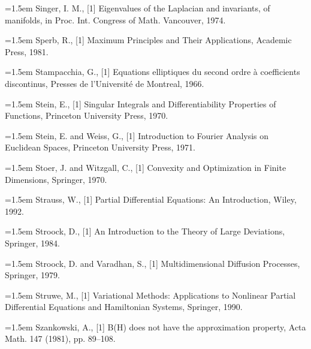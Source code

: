\noindent\hangindent=1.5em Singer, I. M., \hypertarget{ref:Singer-1}{[1]} Eigenvalues of the Laplacian and invariants, of manifolds, in Proc. Int. Congress of Math. Vancouver, 1974.\par{}
\noindent\hangindent=1.5em Sperb, R., \hypertarget{ref:Sperb-1}{[1]} Maximum Principles and Their Applications, Academic Press, 1981.\par{}
\noindent\hangindent=1.5em Stampacchia, G., \hypertarget{ref:Stampacchia-1}{[1]} Equations elliptiques du second ordre à coefficients discontinus, Presses de l'Université de Montreal, 1966.\par{}
\noindent\hangindent=1.5em Stein, E., \hypertarget{ref:Stein-1}{[1]} Singular Integrals and Differentiability Properties of Functions, Princeton University Press, 1970.\par{}
\noindent\hangindent=1.5em Stein, E. and Weiss, G., \hypertarget{ref:SteinWeiss-1}{[1]} Introduction to Fourier Analysis on Euclidean Spaces, Princeton University Press, 1971.\par{}
\noindent\hangindent=1.5em Stoer, J. and Witzgall, C., \hypertarget{ref:StoerWitzgall-1}{[1]} Convexity and Optimization in Finite Dimensions, Springer, 1970.\par{}
\noindent\hangindent=1.5em Strauss, W., \hypertarget{ref:Strauss-1}{[1]} Partial Differential Equations: An Introduction, Wiley, 1992.\par{}
\noindent\hangindent=1.5em Stroock, D., \hypertarget{ref:Stroock-1}{[1]} An Introduction to the Theory of Large Deviations, Springer, 1984.\par{}
\noindent\hangindent=1.5em Stroock, D. and Varadhan, S., \hypertarget{ref:StroockVaradhan-1}{[1]} Multidimensional Diffusion Processes, Springer, 1979.\par{}
\noindent\hangindent=1.5em Struwe, M., \hypertarget{ref:Struwe-1}{[1]} Variational Methods: Applications to Nonlinear Partial Differential Equations and Hamiltonian Systems, Springer, 1990.\par{}
\noindent\hangindent=1.5em Szankowski, A., \hypertarget{ref:Szankowski-1}{[1]} B(H) does not have the approximation property, Acta Math. 147 (1981), pp. 89--108.\par{}
